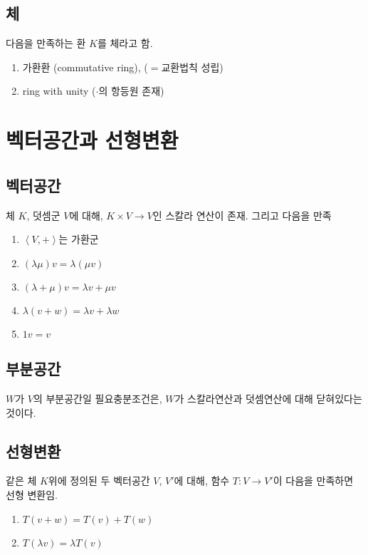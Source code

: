 \documentclass[oneside]{oblivoir}
\begin{document}
\subsection{체}
다음을 만족하는 환 $K$를 체라고 함.
\begin{enumerate}
    \item 가환환 (commutative ring), ($=$교환법칙 성립)
    \item ring with unity ($\cdot$의 항등원 존재)
\end{enumerate}


\section{벡터공간과 선형변환}
\subsection{벡터공간}
체 $K$, 덧셈군 $V$에 대해,
 $K \times V \to V$인 스칼라 연산이 존재.
 그리고 다음을 만족
\begin{enumerate}
    \item $\left\langle  V,+ \right\rangle$는 가환군
    \item $(\lambda \mu)v = \lambda(\mu v) $
    \item $(\lambda + \mu) v =\lambda v + \mu v$
    \item $\lambda (v + w) = \lambda v + \lambda w$
    \item $1 v = v$
\end{enumerate}

\subsection{부분공간}
$W$가 $V$의 부분공간일 필요충분조건은, $W$가 스칼라연산과 덧셈연산에 대해 닫혀있다는 것이다.

\subsection{선형변환}
같은 체 $K$위에 정의된 두 벡터공간 $V$, $V'$에 대해,
함수 $T : V \to V'$이 다음을 만족하면 선형 변환임.
\begin{enumerate}
    \item $T(v+w) = T(v)+T(w)$
    \item $T(\lambda v) = \lambda T(v)$
\end{enumerate}
\end{document}

